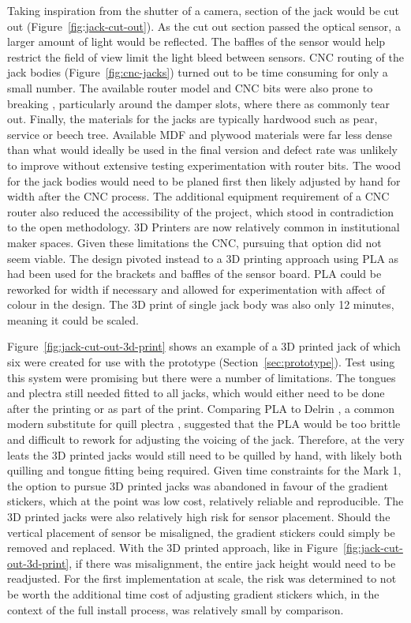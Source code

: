 Taking inspiration from the shutter of a camera, section of the jack would be
cut out (Figure~\ref{fig:jack-cut-out}). As the cut out section passed the
optical sensor, a larger amount of light would be reflected. The baffles of the
sensor would help restrict the field of view limit the light bleed between
sensors. CNC routing of the jack bodies (Figure~\ref{fig:cnc-jacks}) turned out to be time consuming for only
a small number. The available router model and CNC bits were also prone to
breaking , particularly around the damper slots, where there as commonly tear
out. Finally, the materials for the jacks are typically hardwood such as pear,
service or beech tree. Available MDF and plywood materials were far less dense
than what would ideally be used in the final version and defect rate was
unlikely to improve without extensive testing experimentation with router bits.
The wood for the jack bodies would need to be planed first then likely adjusted
by hand for width after the CNC process. The additional equipment requirement of
a CNC router also reduced the accessibility of the project, which stood in
contradiction to the open methodology. 3D Printers are now relatively common in
institutional maker spaces. Given these limitations the CNC, pursuing that
option did not seem viable. The design pivoted instead to a 3D printing approach
using PLA as had been used for the brackets and baffles of the sensor board. PLA
could be reworked for width if necessary and allowed for experimentation with
affect of colour in the design. The 3D print of single jack body was also only
12 minutes, meaning it could be scaled.


Figure~\ref{fig:jack-cut-out-3d-print} shows an example of a 3D printed jack of which six were created for use with the prototype (Section~\ref{sec:prototype}). Test using this system were promising but there were a number of limitations. The tongues and plectra still needed fitted to all jacks, which would either need to be done after the printing or as part of the print. Comparing PLA \cite{bcn3d_pla_2019} to Delrin \cite{dupont_delrin_2017}, a common modern substitute for quill plectra \cite{barclay_preservation_2005}, suggested that the PLA would be too brittle and difficult to rework for adjusting the voicing of the jack. Therefore, at the very leats the 3D printed jacks would still need to be quilled by hand, with likely both quilling and tongue fitting being required. Given time constraints for the Mark 1, the option to pursue 3D printed jacks was abandoned in favour of the gradient stickers, which at the point was low cost, relatively reliable and reproducible. The 3D printed jacks were also relatively high risk for sensor placement. Should the vertical placement of sensor be misaligned, the gradient stickers could simply be removed and replaced. With the 3D printed approach, like in Figure~\ref{fig:jack-cut-out-3d-print}, if there was misalignment, the entire jack height would need to be readjusted. For the first implementation at scale, the risk was determined to not be worth the additional time cost of adjusting gradient stickers which, in the context of the full install process, was relatively small by comparison.

